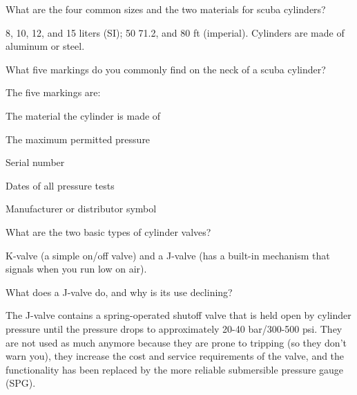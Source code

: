 	\begin{qanda}
		\begin{question}
What are the four common sizes and the two materials for scuba cylinders?
		\end{question}

		\begin{answer}
8, 10, 12, and 15 liters (SI); 50 71.2, and 80 ft (imperial).  Cylinders are made of aluminum or steel.
		\end{answer}
	\end{qanda}

	\begin{qanda}
		\begin{question}
What five markings do you commonly find on the neck of a scuba cylinder?
		\end{question}

		\begin{answer}
The five markings are:
			\begin{nospacenumberedlist}
				\item The material the cylinder is made of
				\item The maximum permitted pressure
				\item Serial number
				\item Dates of all pressure tests
				\item Manufacturer or distributor symbol
			\end{nospacenumberedlist}
		\end{answer}
	\end{qanda}

	\begin{qanda}
		\begin{question}
What are the two basic types of cylinder valves?
		\end{question}

		\begin{answer}
K-valve (a simple on/off valve) and a J-valve (has a built-in mechanism that signals when you run low on air).
		\end{answer}
	\end{qanda}

	\begin{qanda}
		\begin{question}
What does a J-valve do, and why is its use declining?
		\end{question}

		\begin{answer}
The J-valve contains a spring-operated shutoff valve that is held open by cylinder pressure until the pressure drops to approximately 20-40 bar/300-500 psi.  They are not used as much anymore because they are prone to tripping (so they don't warn you), they increase the cost and service requirements of the valve, and the functionality has been replaced by the more reliable submersible pressure gauge (SPG).
		\end{answer}
	\end{qanda}


